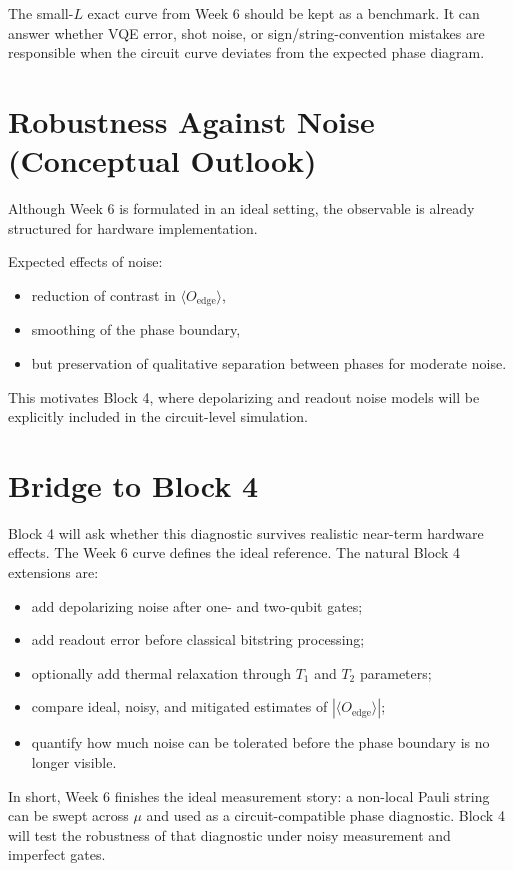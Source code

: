 \documentclass[11pt]{article}
\begin{document}
The small-$L$ exact curve from Week 6 should be kept as a benchmark. It can answer whether VQE error, shot noise, or sign/string-convention mistakes are responsible when the circuit curve deviates from the expected phase diagram.
\section{Robustness Against Noise (Conceptual Outlook)}

Although Week 6 is formulated in an ideal setting, the observable is already structured for hardware implementation.

Expected effects of noise:
\begin{itemize}
  \item reduction of contrast in $\langle O_{\mathrm{edge}} \rangle$,
  \item smoothing of the phase boundary,
  \item but preservation of qualitative separation between phases for moderate noise.
\end{itemize}

This motivates Block 4, where depolarizing and readout noise models will be explicitly included in the circuit-level simulation.
\section{Bridge to Block 4}

Block 4 will ask whether this diagnostic survives realistic near-term hardware effects. The Week 6 curve defines the ideal reference. The natural Block 4 extensions are:
\begin{itemize}
  \item add depolarizing noise after one- and two-qubit gates;
  \item add readout error before classical bitstring processing;
  \item optionally add thermal relaxation through $T_1$ and $T_2$ parameters;
  \item compare ideal, noisy, and mitigated estimates of $|\langle O_{\mathrm{edge}}\rangle|$;
  \item quantify how much noise can be tolerated before the phase boundary is no longer visible.
\end{itemize}

In short, Week 6 finishes the ideal measurement story: a non-local Pauli string can be swept across $\mu$ and used as a circuit-compatible phase diagnostic. Block 4 will test the robustness of that diagnostic under noisy measurement and imperfect gates.
\end{document}
